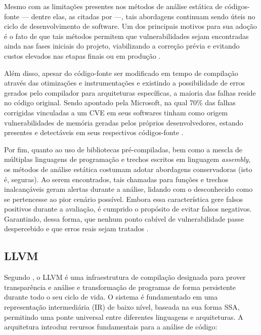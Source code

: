\documentclass[
    12pt,                %
    openright,           %
    oneside,             %
    a4paper,             %
    english,             %
    brazil               %
]{abntex2}
\begin{document}
Mesmo com as limitações presentes nos métodos de análise estática de códigos-fonte — dentre elas, as citadas por  —, tais abordagens continuam sendo úteis no ciclo de  desenvolvimento de software. 
Um dos principais motivos para sua adoção é o fato de que tais métodos permitem que vulnerabilidades sejam encontradas ainda nas fases iniciais do projeto, viabilizando a correção prévia e evitando custos elevados nas etapas finais ou em produção \cite{spa}.
\par
Além disso, apesar do código-fonte ser modificado em tempo de compilação através das otimizações e instrumentações e existindo a possibilidade de erros gerados pelo compilador para arquiteturas específicas, a maioria das falhas reside no código original. 
Sendo apontado pela Microsoft, na qual 70\% das falhas corrigidas vinculadas a um CVE em seus softwares tinham como origem vulnerabilidades de memória geradas pelos próprios desenvolvedores, estando presentes e detectáveis em seus respectivos códigos-fonte \cite{MSRC2019}.
\par
Por fim, quanto ao uso de bibliotecas pré-compiladas, bem como a mescla de múltiplas linguagens de programação e trechos escritos em linguagem \textit{assembly}, os métodos de análise estática costumam adotar abordagens conservadoras (isto é, seguras). Ao serem encontrados, 
tais chamadas para funções e trechos inalcançáveis geram alertas durante a análise, lidando com o desconhecido como se pertencesse ao pior cenário possível. Embora essa característica gere falsos positivos durante a avaliação, é cumprido o propósito de evitar falsos negativos. 
Garantindo, dessa forma, que nenhum ponto cabível de vulnerabilidade passe despercebido e que erros reais sejam tratados \cite{spa}.

\subsection{LLVM}
\label{subsec:llvm}

Segundo , o LLVM é uma infraestrutura de compilação designada para prover transparência e análise e transformação de programas de forma persistente 
durante todo o seu ciclo de vida. O sistema é fundamentado em uma representação intermediária (IR) de baixo nível, baseada na sua forma SSA, permitindo uma ponte universal entre diferentes linguagens 
e arquiteturas. A arquitetura introduz recursos fundamentais para a análise de código:
\end{document}
